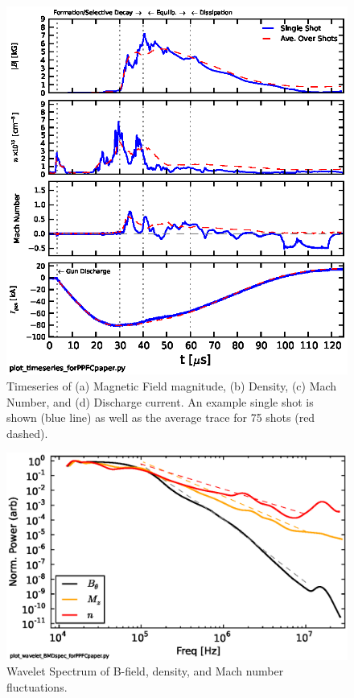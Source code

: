 \documentclass[12pt]{iopart}
\begin{document}
\begin{figure}[!htbp]
\centerline{
\includegraphics[width=16cm]{timeseries36.eps}}
\caption{\label{fig:timeseries36} Timeseries of (a) Magnetic Field magnitude, (b) Density, (c) Mach Number, and (d) Discharge current. An example single shot is shown (blue line) as well as the average trace for 75 shots (red dashed).}
\end{figure}
 \begin{figure}[!htbp]
\centerline{
\includegraphics[width=16cm]{waveletspec.eps}}
\caption{\label{fig:waveletspec} Wavelet Spectrum of B-field, density, and Mach number fluctuations.}
\end{figure}
\end{document}
